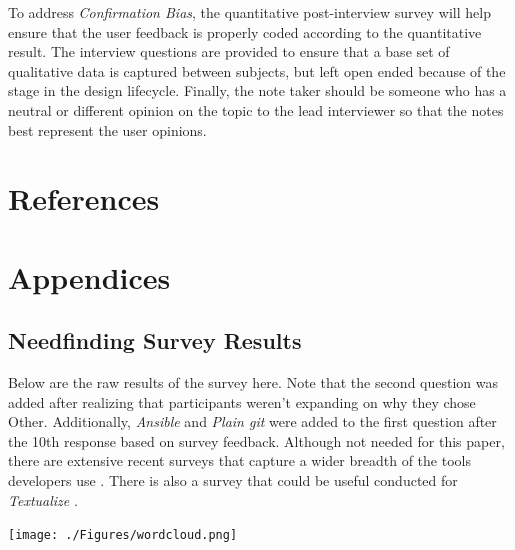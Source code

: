 \documentclass[letterpaper]{jdf}
\begin{document}
To address \emph{Confirmation Bias}, the quantitative post-interview survey will help ensure that the user feedback is properly coded according to the quantitative result. The interview questions are provided to ensure that a base set of qualitative data is captured between subjects, but left open ended because of the stage in the design lifecycle. Finally, the note taker should be someone who has a neutral or different opinion on the topic to the lead interviewer so that the notes best represent the user opinions.


\section{References}
\printbibliography[heading=none]

\appendix
\section{Appendices}

\subsection{Needfinding Survey Results}\label{appendix:survey_1_results}
Below are the raw results of the survey here. Note that the second question was added after realizing that participants weren't expanding on why they chose Other. Additionally, \emph{Ansible} and \emph{Plain git} were added to the first question after the 10th response based on survey feedback. Although not needed for this paper, there are extensive recent surveys that capture a wider breadth of the tools developers use \citep{Walladge2017}. There is also a survey that could be useful conducted for \emph{Textualize} \citep{McGugan2022}.

\begin{jdffigure}
\texttt{[image: ./Figures/wordcloud.png]}
\label{fig:survey_survey_words}
\end{jdffigure}
\end{document}
